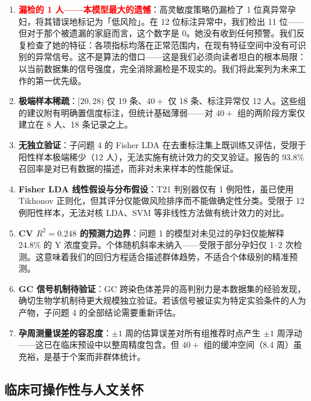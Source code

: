 \documentclass{mcm-paper}
\begin{document}
\begin{enumerate}
    \item \textbf{\textcolor{red}{漏检的 1 人——本模型最大的遗憾}}：高灵敏度策略仍漏检了 1 位真异常孕妇，将其错误地标记为「低风险」。在 12 位标注异常中，我们检出 11 位——但对于那个被遗漏的家庭而言，这个数字是 0。她没有收到任何预警。我们反复检查了她的特征：各项指标均落在正常范围内，在现有特征空间中没有可识别的异常信号。这不是算法的借口——这是我们必须向读者坦白的根本局限：以当前数据集的信号强度，完全消除漏检是不现实的。我们将此案列为未来工作的第一优先级。

    \item \textbf{极端样本稀疏}：$[20,28)$ 仅 19 条、$40+$ 仅 18 条、标注异常仅 12 人。这些组的建议附有明确置信度标注，但统计基础薄弱——对 $40+$ 组的两阶段方案仅建立在 8 人、18 条记录之上。

    \item \textbf{无独立验证}：子问题 4 的 Fisher LDA 在去重标注集上既训练又评估，受限于阳性样本极端稀少（12 人），无法实施有统计效力的交叉验证。报告的 93.8\% 召回率是对已有数据的描述，而非对未来样本的性能保证。

    \item \textbf{Fisher LDA 线性假设与分布假设}：T21 判别器仅有 1 例阳性，虽已使用 Tikhonov 正则化，但其评分仅能做风险排序而不能做确定性分类。受限于 12 例阳性样本，无法对核 LDA、SVM 等非线性方法做有统计效力的对比。

    \item \textbf{CV $R^2=0.248$ 的预测力边界}：问题 1 的模型对未见过的孕妇仅能解释 24.8\% 的 Y 浓度变异。个体随机斜率未纳入——受限于部分孕妇仅 1--2 次检测。这意味着我们的回归方程适合描述群体趋势，不适合个体级别的精准预测。

    \item \textbf{GC 信号机制待验证}：GC 跨染色体差异的高判别力是本数据集的经验发现，确切生物学机制待更大规模独立验证。若该信号被证实为特定实验条件的人为产物，子问题 4 的全部结论需要重新评估。

    \item \textbf{孕周测量误差的容忍度}：$\pm 1$ 周的估算误差对所有组推荐时点产生 $\pm 1$ 周浮动——这已在临床预设中以整周精度包含。但 $40+$ 组的缓冲空间（8.4 周）虽充裕，是基于个案而非群体统计。
\end{enumerate}

\subsection{临床可操作性与人文关怀}
\end{document}
